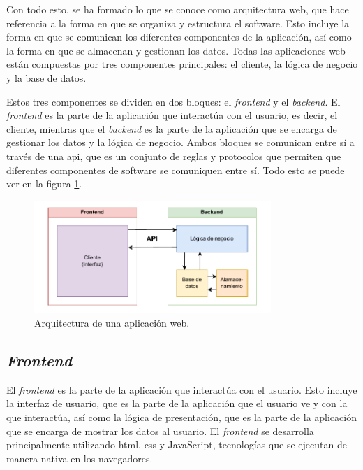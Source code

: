 Con todo esto, se ha formado lo que se conoce como arquitectura web, que hace referencia a la forma en que se organiza y estructura el software. Esto incluye la forma en que se comunican los diferentes componentes de la aplicación, así como la forma en que se almacenan y gestionan los datos. Todas las aplicaciones web están compuestas por tres componentes principales: el cliente, la lógica de negocio y la base de datos.

Estos tres componentes se dividen en dos bloques: el \textit{frontend} y el \textit{backend}. El \textit{frontend} es la parte de la aplicación que interactúa con el usuario, es decir, el cliente, mientras que el \textit{backend} es la parte de la aplicación que se encarga de gestionar los datos y la lógica de negocio. Ambos bloques se comunican entre sí a través de una \gls{api}, que es un conjunto de reglas y protocolos que permiten que diferentes componentes de software se comuniquen entre sí. Todo esto se puede ver en la figura \ref{fig:arquitectura_web}.

\begin{figure}[H]
    \centering
    \includegraphics[width=0.8\textwidth]{figures/theoric_frame/arquitectura_web.pdf}
    \caption{Arquitectura de una aplicación web.}
    \label{fig:arquitectura_web}
\end{figure}

\subsection{\textit{Frontend}}
\label{mt:subsec:frontend}

El \textit{frontend} es la parte de la aplicación que interactúa con el usuario. Esto incluye la interfaz de usuario, que es la parte de la aplicación que el usuario ve y con la que interactúa, así como la lógica de presentación, que es la parte de la aplicación que se encarga de mostrar los datos al usuario. El \textit{frontend} se desarrolla principalmente utilizando \gls{html}, \gls{css} y JavaScript, tecnologías que se ejecutan de manera nativa en los navegadores.

